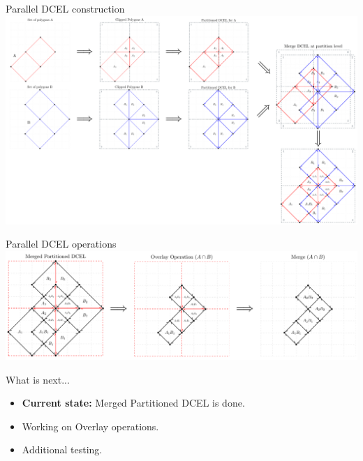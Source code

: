 \documentclass{beamer}
\begin{document}
\begin{frame}{Parallel DCEL construction}
    \centering 
    \includegraphics[width=\linewidth]{figures/OverlayParted1} 
\end{frame}

\begin{frame}{Parallel DCEL operations}
    \centering 
    \includegraphics[width=\linewidth]{figures/OverlayParted2} 
\end{frame}

\begin{frame}{What is next...}
    \begin{itemize}
        \item \textbf{Current state:} Merged Partitioned DCEL is done.
        \item Working on Overlay operations.
        \item Additional testing.
    \end{itemize}
\end{frame}
\end{document}
